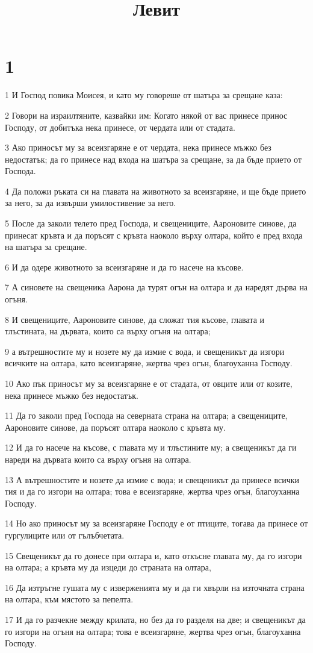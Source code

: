 

\title{Левит}


\chapter{1}

\par 1 И Господ повика Моисея, и като му говореше от шатъра за срещане каза:
\par 2 Говори на израилтяните, казвайки им: Когато някой от вас принесе принос Господу, от добитъка нека принесе, от чердата или от стадата.
\par 3 Ако приносът му за всеизгаряне е от чердата, нека принесе мъжко без недостатък; да го принесе над входа на шатъра за срещане, за да бъде прието от Господа.
\par 4 Да положи ръката си на главата на животното за всеизгаряне, и ще бъде прието за него, за да извърши умилостивение за него.
\par 5 После да заколи телето пред Господа, и свещениците, Аароновите синове, да принесат кръвта и да поръсят с кръвта наоколо върху олтара, който е пред входа на шатъра за срещане.
\par 6 И да одере животното за всеизгаряне и да го насече на късове.
\par 7 А синовете на свещеника Аарона да турят огън на олтара и да наредят дърва на огъня.
\par 8 И свещениците, Аароновите синове, да сложат тия късове, главата и тлъстината, на дървата, които са върху огъня на олтара;
\par 9 а вътрешностите му и нозете му да измие с вода, и свещеникът да изгори всичките на олтара, като всеизгаряне, жертва чрез огън, благоуханна Господу.
\par 10 Ако пък приносът му за всеизгаряне е от стадата, от овците или от козите, нека принесе мъжко без недостатък.
\par 11 Да го заколи пред Господа на северната страна на олтара; а свещениците, Аароновите синове, да поръсят олтара наоколо с кръвта му.
\par 12 И да го насече на късове, с главата му и тлъстините му; а свещеникът да ги нареди на дървата които са върху огъня на олтара.
\par 13 А вътрешностите и нозете да измие с вода; и свещеникът да принесе всички тия и да го изгори на олтара; това е всеизгаряне, жертва чрез огън, благоуханна Господу.
\par 14 Но ако приносът му за всеизгаряне Господу е от птиците, тогава да принесе от гургулиците или от гълъбчетата.
\par 15 Свещеникът да го донесе при олтара и, като откъсне главата му, да го изгори на олтара; а кръвта му да изцеди до страната на олтара,
\par 16 Да изтръгне гушата му с изверженията му и да ги хвърли на източната страна на олтара, към мястото за пепелта.
\par 17 И да го разчекне между крилата, но без да го разделя на две; и свещеникът да го изгори на огъня на олтара; това е всеизгаряне, жертва чрез огън, благоуханна Господу.

